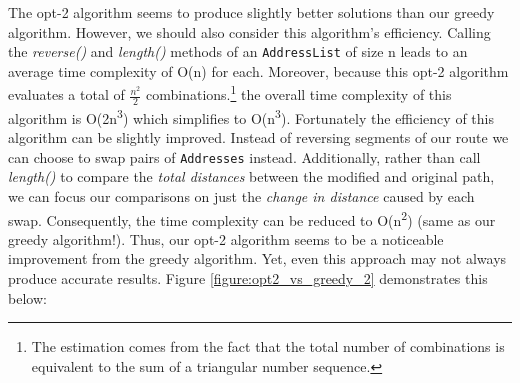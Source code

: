 \documentclass[letterpaper]{article}
\begin{document}
\begin{figure}[h]
\begin{minipage}{0.3\linewidth}
        \end{minipage}
    \end{figure}
    

    The opt-2 algorithm seems to produce slightly better solutions than our 
    greedy algorithm. However, we should also consider this algorithm's 
    efficiency. Calling the \emph{reverse()} and \emph{length()} methods of an 
    \verb|AddressList| of size n leads to an average time complexity of O(n)
    for each. Moreover, because this opt-2 algorithm evaluates a total of 
    \(\frac{n^2}{2}\) combinations.\footnote{The estimation comes from 
    the fact that the total number of combinations is equivalent to the 
    sum of a triangular number sequence.} the overall time complexity of 
    this algorithm is O(2n\textsuperscript3)  which simplifies to 
    O(n\textsuperscript3). Fortunately the efficiency of this algorithm 
    can be slightly improved. Instead of reversing segments of our route 
    we can choose to swap pairs of \verb|Addresses| instead.  Additionally, rather 
    than call \emph{length()} to compare the \emph{total distances} between the 
    modified and original path, we can focus our comparisons on just the 
    \emph{change in distance} caused by each swap.
    Consequently, the time complexity can be reduced to 
    O(n\textsuperscript2) (same as our greedy algorithm!). Thus, our opt-2 algorithm seems to be a noticeable 
    improvement from the greedy algorithm. Yet, even this 
    approach may not always produce accurate results. Figure \ref*{figure:opt2_vs_greedy_2} demonstrates this below:
    
\end{document}
